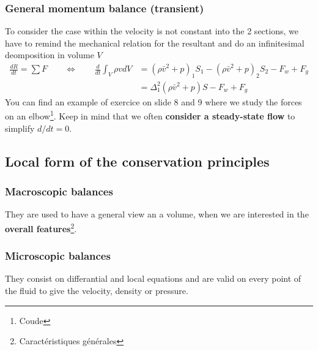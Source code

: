 		\subsubsection{General momentum balance (transient)}
			To consider the case within the velocity is not constant into the 2 sections, we have to remind the mechanical relation for the resultant and do an infinitesimal deomposition in volume $V$	
			\begin{equation}						
			\begin{aligned}
				\frac{dR}{dt} = \sum F \qquad \Leftrightarrow \qquad \frac{d}{dt}\int _V \rho v dV &= (\rho \bar{v}^2 +p)_1S_1 - (\rho \bar{v}^2 +p)_2S_2 - F_w + F_g \\
				&= \Delta ^2 _1 (\rho \bar{v}^2  +p)S-F_w+F_g
			\end{aligned}
			\end{equation}
			You can find an example of exercice on slide 8 and 9 where we study the forces on an elbow\footnote{Coude}. Keep in mind that we often \textbf{consider a steady-state flow} to simplify $d/dt = 0$.
			
		\subsection{Local form of the conservation principles}
			\subsubsection{Macroscopic balances}
				They are used to have a general view an a volume, when we are interested in the \textbf{overall features}\footnote{Caractéristiques générales}.
			\subsubsection{Microscopic balances}
				They consist on differantial and local equations and are valid on every point of the fluid to give the velocity, density or pressure. 

